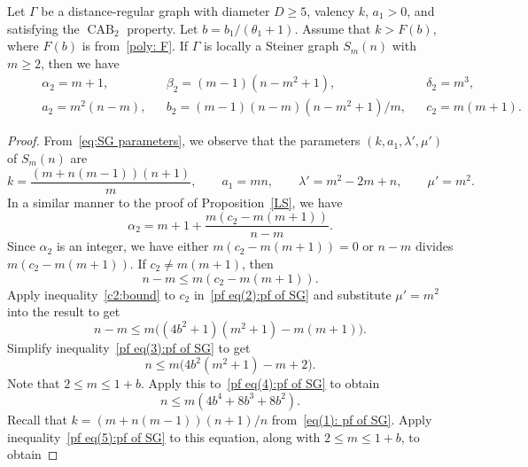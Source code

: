 \begin{prop}\label{Steiner}
Let $\Gamma$ be a distance-regular graph with diameter $D \geqslant 5$, valency $k$, $a_1 > 0$, and satisfying the $\operatorname{CAB}_2$ property. 
Let $b=b_1/(\theta_1+1)$.
Assume that $k > F(b)$, where $F(b)$ is from~\eqref{poly: F}.
If $\Gamma$ is locally a Steiner graph $S_m(n)$ with $m \geqslant 2$, then we have
\begin{align}
	&& & \alpha_2 =m+1, && \beta_2 =(m-1)(n-m^2+1), && \delta_2 = m^3, &&  \label{lem:SG para(1)}\\
	&& & a_2 = m^2(n-m), && b_2 = (m-1)(n-m)(n-m^2+1)/m, && c_2 = m(m+1). && \label{lem:SG para(2)}
\end{align}
\end{prop}
\begin{proof}
From~\eqref{eq:SG parameters}, we observe that the parameters $(k,a_1,\lambda', \mu')$ of $S_m(n)$ are 
\begin{equation}\label{eq(1): pf of SG}
	k= \frac{(m+n(m-1))(n+1)}{m}, \qquad a_1 =mn, \qquad \lambda' =  m^2-2m+n, \qquad \mu' = m^2.
\end{equation} 
In a similar manner to the proof of Proposition~\ref{LS}, we have
\begin{equation}\label{pf eq:alpha_2}
	\alpha_2 = m+1 + \frac{m(c_2 -m(m+1))}{n-m}.
\end{equation}
Since $\alpha_2$ is an integer, we have either $m(c_2 -m(m+1))=0$ or $n-m$ divides $m(c_2 -m(m+1))$.
If $c_2 \neq m(m+1)$, then 
\begin{equation}\label{pf eq(2):pf of SG}
	n-m \leqslant m(c_2 -m(m+1)).
\end{equation}
Apply inequality~\eqref{c2:bound} to $c_2$ in~\eqref{pf eq(2):pf of SG} and substitute $\mu' = m^2$ into the result to get
\begin{equation}\label{pf eq(3):pf of SG}
	n - m \leqslant m\big( (4b^2+1)(m^2+1) - m(m+1) \big).
\end{equation}
Simplify inequality~\eqref{pf eq(3):pf of SG} to get
\begin{equation}\label{pf eq(4):pf of SG}
	n \leqslant m \big( 4b^2(m^2+1) - m +2 \big).
\end{equation}
Note that $2\leqslant m \leqslant 1+b$.
Apply this to~\eqref{pf eq(4):pf of SG} to obtain
\begin{equation}\label{pf eq(5):pf of SG}
	n \leqslant m (4b^4 + 8b^3 + 8b^2).
\end{equation}
Recall that $k = (m+n(m-1))(n+1)/n$ from~\eqref{eq(1): pf of SG}.
Apply inequality~\eqref{pf eq(5):pf of SG} to this equation, along with $2\leqslant m \leqslant 1+b$, to obtain

\end{proof}

